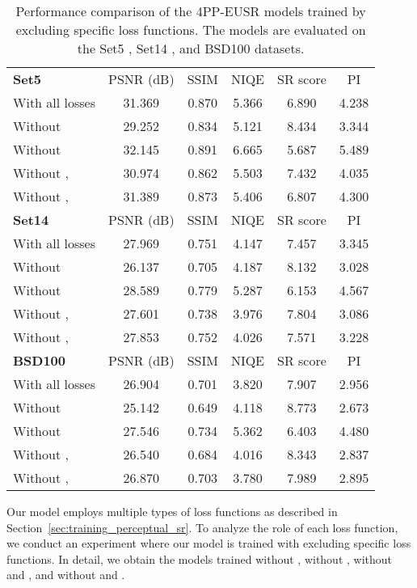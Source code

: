 \documentclass[runningheads]{llncs}
\begin{document}
\begin{table}[t]
	\setlength{\tabcolsep}{0.4em}
	\scriptsize
	\centering
	\caption{Performance comparison of the 4PP-EUSR models trained by excluding specific loss functions. The models are evaluated on the Set5 \cite{bevilacqua2012low}, Set14 \cite{zeyde2010single}, and BSD100 \cite{martin2001database} datasets.}
	\label{table:result_loss_comparison}
	\begin{tabular}{lccccc}
		\textbf{Set5} & PSNR (dB) & SSIM & NIQE & SR score & PI \\
		\noalign{\smallskip}
		\hline
		\noalign{\smallskip}
		With all losses & 31.369 & 0.870 & 5.366 & 6.890 & 4.238 \\
		Without  & 29.252 & 0.834 & 5.121 & 8.434 & 3.344 \\
		Without  & 32.145 & 0.891 & 6.665 & 5.687 & 5.489 \\
		Without ,  & 30.974 & 0.862 & 5.503 & 7.432 & 4.035 \\
		Without ,  & 31.389 & 0.873 & 5.406 & 6.807 & 4.300 \\
		\noalign{\smallskip}
		\noalign{\smallskip}
		\textbf{Set14} & PSNR (dB) & SSIM & NIQE & SR score & PI \\
		\noalign{\smallskip}
		\hline
		\noalign{\smallskip}
		With all losses & 27.969 & 0.751 & 4.147 & 7.457 & 3.345 \\
		Without  & 26.137 & 0.705 & 4.187 & 8.132 & 3.028 \\
		Without  & 28.589 & 0.779 & 5.287 & 6.153 & 4.567 \\
		Without ,  & 27.601 & 0.738 & 3.976 & 7.804 & 3.086 \\
		Without ,  & 27.853 & 0.752 & 4.026 & 7.571 & 3.228 \\
		\noalign{\smallskip}
		\noalign{\smallskip}
		\textbf{BSD100} & PSNR (dB) & SSIM & NIQE & SR score & PI \\
		\noalign{\smallskip}
		\hline
		\noalign{\smallskip}
		With all losses & 26.904 & 0.701 & 3.820 & 7.907 & 2.956 \\
		Without  & 25.142 & 0.649 & 4.118 & 8.773 & 2.673 \\
		Without  & 27.546 & 0.734 & 5.362 & 6.403 & 4.480 \\
		Without ,  & 26.540 & 0.684 & 4.016 & 8.343 & 2.837 \\
		Without ,  & 26.870 & 0.703 & 3.780 & 7.989 & 2.895
	\end{tabular}
\end{table}


Our model employs multiple types of loss functions as described in Section~\ref{sec:training_perceptual_sr}.
To analyze the role of each loss function, we conduct an experiment where our model is trained with excluding specific loss functions.
In detail, we obtain the models trained without , without , without  and , and without  and .
\end{document}
